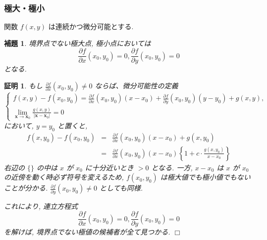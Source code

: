\documentclass{jsarticle}
\theoremstyle{plain}
\newtheorem{lemm}{補題}[section]
\newtheorem{Proof}{証明}[section]
\def\qed{\hfill $\Box$} %
\begin{document}
  \subsubsection{極大・極小}
  関数 $f(x, y)$ は連続かつ微分可能とする.
  \begin{lemm}
  境界点\footnotemark でない極大点, 極小点においては
    \begin{equation}
      \frac{\partial f}{\partial x}(x_0, y_0) = 0, \frac{\partial f}{\partial y}(x_0, y_0) = 0
    \end{equation}
  となる.
  \end{lemm}
  \begin{Proof}
  もし $\frac{\partial f}{\partial x}(x_0, y_0) \neq 0$ ならば、微分可能性の定義\footnotemark
    \begin{equation*}
      \begin{cases}
        f(x, y) - f(x_0, y_0) = \frac{\partial f}{\partial x}(x_0, y_0)(x - x_0) + \frac{\partial f}{\partial y}(x_0, y_0)(y - y_0) + g(x, y), \\
        \lim_{\bm{x} \to \bm{x}_0} \frac{g(x, y)}{|\bm{x} - \bm{x}_0 |} = 0
      \end{cases}
    \end{equation*}
    において, $y = y_0$ と置くと,
    \begin{eqnarray*}
      f(x, y_0) - f(x_0, y_0) &=& \frac{\partial f}{\partial x}(x_0, y_0)(x - x_0) + g(x, y_0) \\
       &=& \frac{\partial f}{\partial x}(x_0, y_0)(x - x_0)\left\{ 1 + c \cdot \frac{g(x, y_0)}{x - x_0} \right\}
    \end{eqnarray*}
    右辺の $\{  \}$ の中は $x$ が $x_0$ に十分近いとき $> 0$ となる. 一方, $x - x_0$ は $x$ が $x_0$ の近傍を動く時必ず符号を変えるため, 
    $f(x_0, y_0)$ は極大値でも極小値でもないことが分かる. $\frac{\partial f}{\partial y}(x_0, y_0) \neq 0$ としても同様.

    これにより, 連立方程式
    \begin{equation*}
      \frac{\partial f}{\partial x}(x_0, y_0) = 0, \frac{\partial f}{\partial y}(x_0, y_0) = 0
    \end{equation*}
    を解けば, 境界点でない極値の候補者が全て見つかる. \qed
  \end{Proof}
\end{document}
